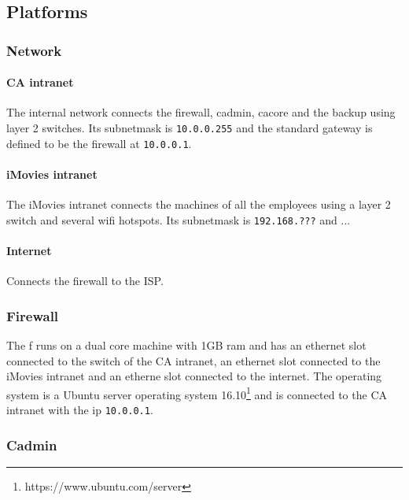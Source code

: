 \documentclass[english]{article}
\begin{document}
  \subsection{Platforms}



\subsubsection{Network}



\paragraph{CA intranet} The internal network connects the firewall, cadmin, cacore and the backup using layer 2 switches. Its subnetmask is \texttt{10.0.0.255} and the standard gateway is defined to be the firewall at \texttt{10.0.0.1}.



\paragraph{iMovies intranet} The iMovies intranet connects the machines of all the employees using a layer 2 switch and several wifi hotspots. Its subnetmask is \texttt{192.168.???} and ...



\paragraph{Internet} Connects the firewall to the ISP.



\subsubsection{Firewall}

The f runs on a dual core machine with 1GB ram and has an ethernet slot connected to the switch of the CA intranet, an ethernet slot connected to the iMovies intranet and an etherne slot connected to the internet. The operating system is a Ubuntu server operating system 16.10\footnote{https://www.ubuntu.com/server} and is connected to the CA intranet with the ip \texttt{10.0.0.1}.



\subsubsection{Cadmin}
\end{document}
